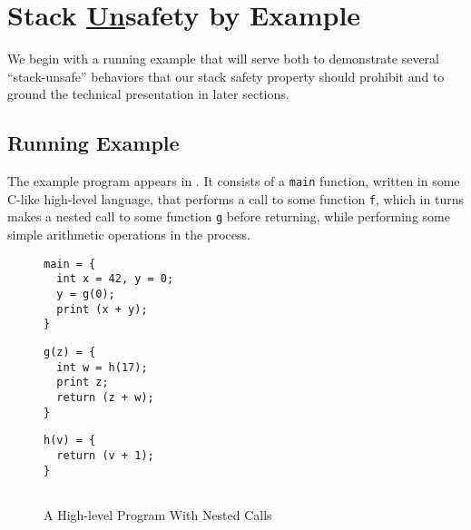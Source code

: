 \documentclass[acmsmall,review,anonymous]{acmart}\settopmatter{printfolios=true,printccs=false,printacmref=false}
\begin{document}
\section{Stack {\underline{Un}}safety by Example}
\label{sec:running-example}

We begin with a running example that will serve both to demonstrate several
``stack-unsafe'' behaviors that our stack safety property should prohibit
and to ground the technical presentation in later sections.

\subsection{Running Example}

The example program appears in . It consists
of a {\tt main} function, written in some C-like high-level language,
that performs a call to some function {\tt f}, which in turns makes a
nested call to some function {\tt g} before returning, while
performing some simple arithmetic operations in the process.

\begin{figure}[b]
\hfill
    \begin{minipage}{.3\textwidth}
\begin{verbatim}
main = {
  int x = 42, y = 0;
  y = g(0);
  print (x + y);
}
\end{verbatim}
    \end{minipage}
    \begin{minipage}{.3\textwidth}
\begin{verbatim}
g(z) = {
  int w = h(17);
  print z;
  return (z + w);
}
\end{verbatim}
    \end{minipage}
    \begin{minipage}{.3\textwidth}
\begin{verbatim}
h(v) = {
  return (v + 1);
}


\end{verbatim}
    \end{minipage}
\caption{A High-level Program With Nested Calls}
\label{fig:running-program}
\end{figure}


\newcommand*{\add}{\textsc{add}}
\newcommand*{\addi}{\textsc{addi}}
\newcommand*{\sw}{\textsc{sw}}
\newcommand*{\lw}{\textsc{lw}}
\newcommand*{\jal}{\textsc{jal}}
\newcommand*{\jalr}{\textsc{jalr}}
\newcommand*{\rsp}{\textsc{sp}}
\newcommand*{\rra}{\textsc{ra}}
\newcommand*{\rout}{\textsc{out}}
\end{document}
